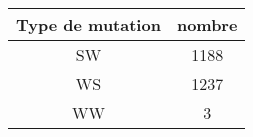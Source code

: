 
\begin{tabular}{cc}
\toprule
Type de mutation & nombre\\
\midrule
SW & 1188\\
WS & 1237\\
WW & 3\\
\bottomrule
\end{tabular}
